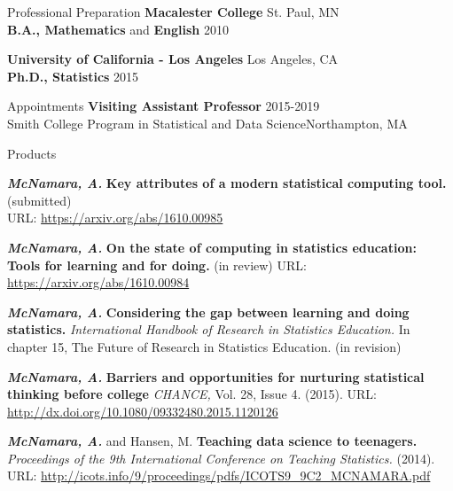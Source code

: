 \documentclass{resume} %
\begin{document}

\begin{rSection}{Professional Preparation}
{\bf Macalester College}  \hfill St. Paul, MN \\
{\bf B.A., Mathematics} and {\bf English}  \hfill  2010 \\ \smallskip 

{\bf University of California - Los Angeles} \hfill Los Angeles, CA \\
{\bf Ph.D., Statistics} \hfill 2015\\ 


\end{rSection}



\begin{rSection}{ Appointments}
{\bf Visiting Assistant Professor} \hfill {2015-2019} \\
{Smith College Program in Statistical and Data Science}\hfill {Northampton, MA} \\
\end{rSection}



\begin{rSection}{Products}

{\bf \em{McNamara, A.}} {\bf Key attributes of a modern statistical computing tool. } (submitted) \\
URL: \url{https://arxiv.org/abs/1610.00985}

{\bf \em{McNamara, A.}} {\bf On the state of computing in statistics education: Tools for learning and for doing. } (in review) URL: \url{https://arxiv.org/abs/1610.00984}

{\bf \em McNamara, A.} {\bf Considering the gap between learning and doing statistics.} {\em International Handbook of Research in Statistics Education.} In chapter 15, The Future of Research in Statistics Education. (in revision) 

{\bf \em McNamara, A.} {\bf Barriers and opportunities for nurturing statistical thinking before college}{ \em CHANCE,} Vol. 28, Issue 4. (2015). URL: \url{http://dx.doi.org/10.1080/09332480.2015.1120126}

{\bf \em McNamara, A. }and Hansen, M. {\bf Teaching data science to teenagers.}{ \em Proceedings of the 9th International Conference on Teaching Statistics.} (2014). URL: \url{http://icots.info/9/proceedings/pdfs/ICOTS9_9C2_MCNAMARA.pdf}

\end{rSection}
\end{document}
